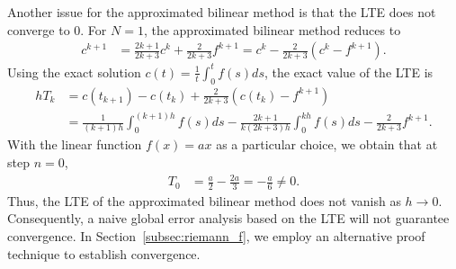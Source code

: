 \documentclass{article}
\theoremstyle{definition}
\begin{document}



Another issue for the approximated bilinear method is that the LTE does not converge to $0$. 
For $N=1$, the approximated bilinear method reduces to 
\begin{align*}
    c^{k+1}
    &= \frac{2k+1}{2k+3}c^k + \frac{2}{2k+3}f^{k+1} = c^k - \frac{2}{2k+3}(c^k - f^{k+1}).
\end{align*}
Using the exact solution $c(t) = \frac{1}{t}\int_0^t f(s)ds$, the exact value of the LTE is
\begin{align*}
    hT_k
    &= c(t_{k+1}) - c(t_{k}) + \frac{2}{2k+3} (c(t_k) - f^{k+1}) \\
    &= \frac{1}{(k+1)h}\int_0^{(k+1)h}f(s)ds - \frac{2k+1}{k(2k+3)h}\int_0^{kh}f(s)ds - \frac{2}{2k+3}f^{k+1} .
\end{align*}
With the linear function $f(x) = ax$ as a particular choice, we obtain that at step $n=0$,
\begin{align*}
    T_0 &= \frac{a}{2} - \frac{2a}{3} 
    = -\frac{a}{6} \ne 0.
\end{align*}
Thus, the LTE of the approximated bilinear method does not vanish as $h\rightarrow 0$.
Consequently, a naive global error analysis based on the LTE will not guarantee convergence. In Section~\ref{subsec:riemann_f}, we employ an alternative proof technique to establish convergence.
\end{document}
